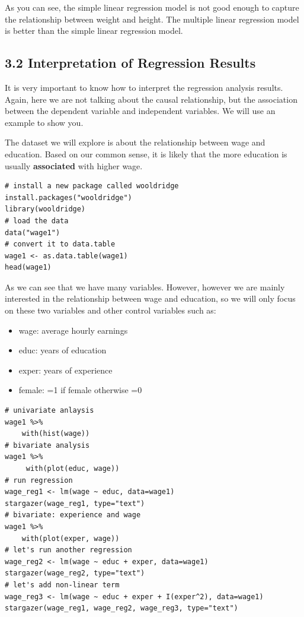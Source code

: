 \documentclass[11pt]{article}
\theoremstyle{definition}
\providecommand{\tightlist}{%
\setlength{\itemsep}{0pt}\setlength{\parskip}{0pt}}
\begin{document}
As you can see, the simple linear regression model is not good enough to 
capture the relationship between weight and height. The multiple linear
regression model is better than the simple linear regression model.

\subsection{3.2 Interpretation of Regression Results}

It is very important to know how to interpret the regression analysis results.
 Again, here we are not talking about the causal relationship, 
 but the association between the dependent variable and independent variables. 
 We will use an example to show you.

The dataset we will explore is about the relationship between wage and education. 
Based on our common sense, it is likely that the more education is 
usually \textbf{associated} with higher wage.

\begin{lstlisting}
# install a new package called wooldridge
install.packages("wooldridge")
library(wooldridge)
# load the data
data("wage1")
# convert it to data.table
wage1 <- as.data.table(wage1)
head(wage1)
\end{lstlisting}

As we can see that we have many variables. However,  however we are mainly interested 
in the relationship between wage and education, so we will only focus 
on these two variables and other control variables such as:

\begin{itemize}
  \tightlist
  \item wage: average hourly earnings
  \item educ: years of education
  \item exper: years of experience
  \item female: =1 if female otherwise =0
\end{itemize}

\begin{lstlisting}
# univariate anlaysis
wage1 %>%
    with(hist(wage))
# bivariate analysis
wage1 %>%
     with(plot(educ, wage))
# run regression
wage_reg1 <- lm(wage ~ educ, data=wage1)
stargazer(wage_reg1, type="text")
# bivariate: experience and wage 
wage1 %>%
    with(plot(exper, wage))
# let's run another regression 
wage_reg2 <- lm(wage ~ educ + exper, data=wage1)
stargazer(wage_reg2, type="text")
# let's add non-linear term
wage_reg3 <- lm(wage ~ educ + exper + I(exper^2), data=wage1)
stargazer(wage_reg1, wage_reg2, wage_reg3, type="text")
\end{lstlisting}
\end{document}
